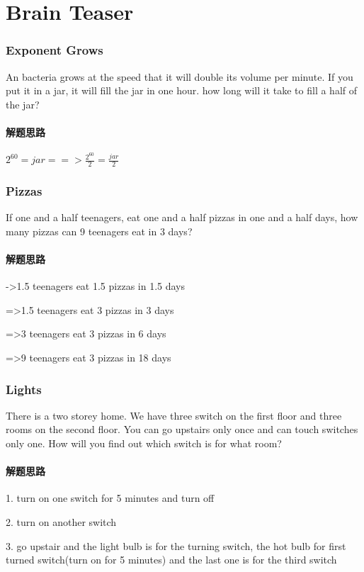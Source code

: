 \chapter{Brain Teaser}

\subsection{Exponent Grows}
An bacteria grows at the speed that it will double its volume per minute. If you put it in a jar, it will fill the jar in one hour. how long will it take to fill a half of the jar?

\subsubsection{解题思路}
$2^{60}=jar==>\frac{2^{60}}{2}=\frac{jar}{2}$

\subsection{Pizzas}
If one and a half teenagers, eat one and a half pizzas in one and a half days, how many pizzas can 9 teenagers eat in 3 days?

\subsubsection{解题思路}
->1.5 teenagers eat 1.5 pizzas in 1.5 days

=>1.5 teenagers eat 3 pizzas in 3 days

=>3 teenagers eat 3 pizzas in 6 days

=>9 teenagers eat 3 pizzas in 18 days

\subsection{Lights}
There is a two storey home. We have three switch on the first floor and three rooms on the second floor. You can go upstairs only once and can touch switches only one. How will 
you find out which switch is for what room?

\subsubsection{解题思路}
1. turn on one switch for 5 minutes and turn off

2. turn on another switch

3. go upstair and the light bulb is for the turning switch, the hot bulb for first turned switch(turn on for 5 minutes) and the last one is for the third switch

